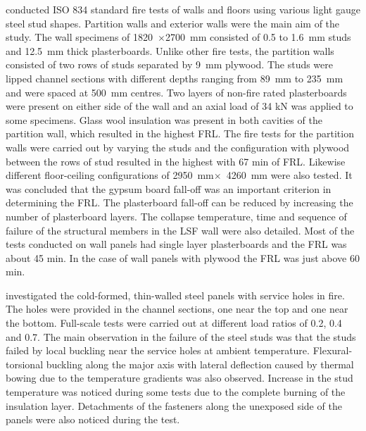 \citet{Sakumoto2003} conducted ISO 834 standard fire tests of walls and floors using various light gauge steel stud shapes. Partition walls and exterior walls were the main aim of the study. The wall specimens of 1820~$\times$2700~mm consisted of 0.5 to 1.6~mm studs and 12.5~mm thick plasterboards. Unlike other fire tests, the partition walls consisted of two rows of studs separated by 9~mm plywood. The studs were lipped channel sections with different depths ranging from 89~mm to 235~mm and were spaced at 500~mm centres. Two layers of non-fire rated plasterboards were present on either side of the wall and an axial load of 34 kN was applied to some specimens. Glass wool insulation was present in both cavities of the partition wall, which resulted in the highest FRL. The fire tests for the partition walls were carried out by varying the studs and the configuration with plywood between the rows of stud resulted in the highest with 67 min of FRL. Likewise different floor-ceiling configurations of 2950~mm$\times$~4260~mm were also tested. It was concluded that the gypsum board fall-off was an important criterion in determining the FRL. The plasterboard fall-off can be reduced by increasing the number of plasterboard layers. The collapse temperature, time and sequence of failure of the structural members in the LSF wall were also detailed. Most of the tests conducted on wall panels had single layer plasterboards and the FRL was about 45 min. In the case of wall panels with plywood the FRL was just above 60 min. 

\citet{Feng2005} investigated the cold-formed, thin-walled steel panels with service holes in fire. The holes were provided in the channel sections, one near the top and one near the bottom. Full-scale tests were carried out at different load ratios of 0.2, 0.4 and 0.7. The main observation in the failure of the steel studs was that the studs failed by local buckling near the service holes at ambient temperature. Flexural-torsional buckling along the major axis with lateral deflection caused by thermal bowing due to the temperature gradients was also observed. Increase in the stud temperature was noticed during some tests due to the complete burning of the insulation layer. Detachments of the fasteners along the unexposed side of the panels were also noticed during the test. 

